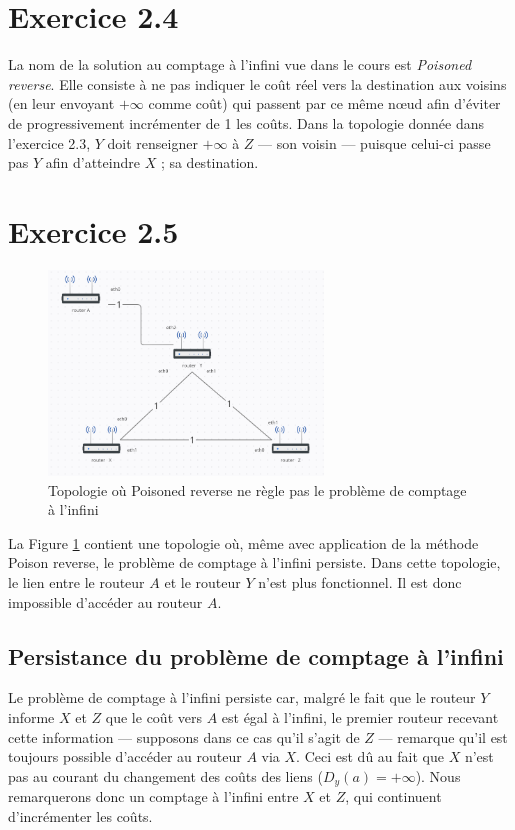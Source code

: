 \documentclass[11pt]{article}
\begin{document}
\section{Exercice 2.4}
La nom de la solution au comptage à l'infini vue dans le cours est \textit{Poisoned reverse}. Elle consiste à ne pas indiquer le coût réel vers la destination aux voisins (en leur envoyant $+\infty$ comme coût) qui passent par ce même nœud afin d'éviter de progressivement incrémenter de 1 les coûts. Dans la topologie donnée dans l'exercice 2.3, $Y$ doit renseigner $+\infty$ à $Z$ --- son voisin --- puisque celui-ci passe pas $Y$ afin d'atteindre $X$ ; sa destination.\\



\section{Exercice 2.5}
\begin{figure} [h!]
\centering
  \includegraphics[width=0.65\textwidth]{../documents/problem-figure.png}
  \caption{Topologie où Poisoned reverse ne règle pas le problème de comptage à l'infini}
   \label{fig:prob-topology}
\end{figure}

La Figure \ref{fig:prob-topology} contient une topologie où, même avec application de la méthode Poison reverse, le problème de comptage à l'infini persiste. Dans cette topologie, le lien entre le routeur $A$ et le routeur $Y$ n'est plus fonctionnel. Il est donc impossible d'accéder au routeur $A$.\\

\subsection{Persistance du problème de comptage à l'infini}
Le problème de comptage à l'infini persiste car, malgré le fait que le routeur $Y$ informe $X$ et $Z$ que le coût vers $A$ est égal à l'infini, le premier routeur recevant cette information --- supposons dans ce cas qu'il s'agit de $Z$ --- remarque qu'il est toujours possible d'accéder au routeur $A$ via $X$. Ceci est dû au fait que $X$ n'est pas au courant du changement des coûts des liens ($D_{y}(a)=+\infty$). Nous remarquerons donc un comptage à l'infini entre $X$ et $Z$, qui continuent d'incrémenter les coûts.\\
\end{document}
